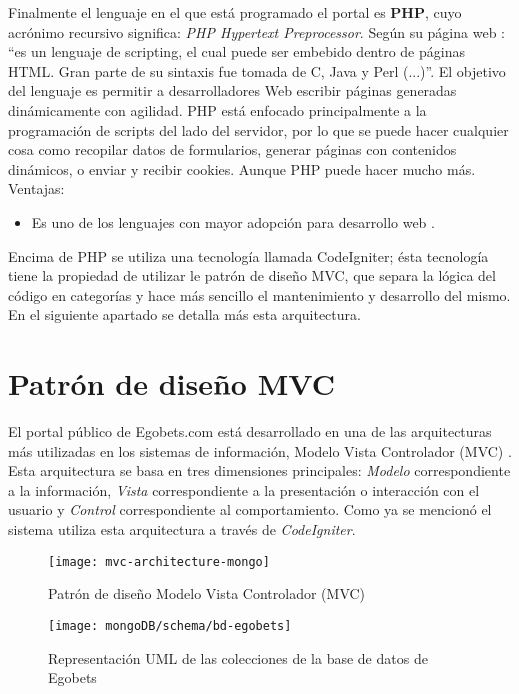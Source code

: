 Finalmente el lenguaje en el que está programado el portal es \textbf{PHP}, cuyo acrónimo recursivo significa: \emph{PHP Hypertext Preprocessor}. Según su página web \cite{phpWeb}: ``es un lenguaje de scripting, el cual puede ser embebido dentro de páginas HTML. Gran parte de su sintaxis fue tomada de C, Java y Perl (...)''. El objetivo del lenguaje es permitir a desarrolladores Web escribir páginas generadas dinámicamente con agilidad.
PHP está enfocado principalmente a la programación de scripts del lado del servidor, por lo que se puede hacer cualquier cosa como recopilar datos de formularios, generar páginas con contenidos dinámicos, o enviar y recibir cookies. Aunque PHP puede hacer mucho más.
				 Ventajas:
	\begin{itemize}
		\item Es uno de los lenguajes con mayor adopción para desarrollo web \cite{tiobeIndex}.
	\end{itemize}

Encima de PHP se utiliza una tecnología llamada CodeIgniter; ésta tecnología tiene la propiedad de utilizar le patrón de diseño MVC, que separa la lógica del código en categorías y hace más sencillo el mantenimiento y desarrollo del mismo. En el siguiente apartado se detalla más esta arquitectura.

\section{Patrón de diseño MVC}

El portal público de Egobets.com está desarrollado en una de las arquitecturas más utilizadas en los sistemas de información, Modelo Vista Controlador (MVC) \cite{alfredo2005ingenieria}. Esta arquitectura se basa en tres dimensiones principales: \emph{Modelo} correspondiente a la información, \emph{Vista} correspondiente a la presentación o interacción con el usuario y \emph{Control} correspondiente al comportamiento. Como ya se mencionó el sistema utiliza esta arquitectura a través de \emph{CodeIgniter}.

\begin{figure}[!htb]\centering
   \begin {minipage}{1\textwidth}
     \texttt{[image: mvc-architecture-mongo]}
     \caption{Patrón de diseño Modelo Vista Controlador (MVC)}\label{Fig:mvc}
   \end{minipage}
\end{figure}

	\begin{figure}[!htb]\centering
	   \begin {minipage}{1\textwidth}
	     \texttt{[image: mongoDB/schema/bd-egobets]}
	     \caption{Representación UML de las colecciones de la base de datos de Egobets}\label{Fig:db-egobets}
	   \end{minipage}
	\end{figure}

